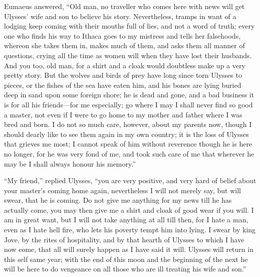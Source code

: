 Eumaeus answered, “Old man, no traveller who comes here with news will get
Ulysses’ wife and son to believe his story. Nevertheless, tramps in want of a
lodging keep coming with their mouths full of lies, and not a word of truth;
every one who finds his way to Ithaca goes to my mistress and tells her
falsehoods, whereon she takes them in, makes much of them, and asks them all
manner of questions, crying all the time as women will when they have lost
their husbands. And you too, old man, for a shirt and a cloak would doubtless
make up a very pretty story. But the wolves and birds of prey have long since
torn Ulysses to pieces, or the fishes of the sea have eaten him, and his bones
are lying buried deep in sand upon some foreign shore; he is dead and gone, and
a bad business it is for all his friends—for me especially; go where I may I
shall never find so good a master, not even if I were to go home to my mother
and father where I was bred and born. I do not so much care, however, about my
parents now, though I should dearly like to see them again in my own country;
it is the loss of Ulysses that grieves me most; I cannot speak of him without
reverence though he is here no longer, for he was very fond of me, and took
such care of me that wherever he may be I shall always honour his memory.”

“My friend,” replied Ulysses, “you are very positive, and very hard of belief
about your master’s coming home again, nevertheless I will not merely say, but
will swear, that he is coming. Do not give me anything for my news till he has
actually come, you may then give me a shirt and cloak of good wear if you will.
I am in great want, but I will not take anything at all till then, for I hate a
man, even as I hate hell fire, who lets his poverty tempt him into lying. I
swear by king Jove, by the rites of hospitality, and by that hearth of Ulysses
to which I have now come, that all will surely happen as I have said it will.
Ulysses will return in this self same year; with the end of this moon and the
beginning of the next he will be here to do vengeance on all those who are ill
treating his wife and son.”

